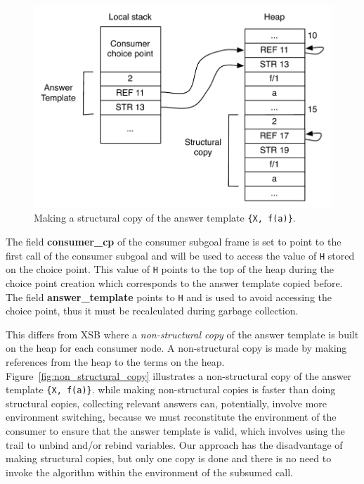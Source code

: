 \begin{figure}[H]
  \centering
    \includegraphics[scale=0.6]{structural_copy.pdf}
  \caption{Making a structural copy of the answer template \texttt{\{X,~f(a)\}}.}
  \label{fig:structural_copy}
\end{figure}

The field \textbf{consumer\_cp} of the consumer subgoal frame is set to point to the first call
of the consumer subgoal and will be used to access the value of \texttt{H} stored on the choice point.
This value of \texttt{H} points to the top of the heap during the choice point creation which corresponds
to the answer template copied before. The field \textbf{answer\_template} points to \texttt{H}
and is used to avoid accessing the choice point, thus it must be recalculated during garbage collection.

This differs from XSB \cite{Johnson-00} where a \textit{non-structural copy} of the answer template
is built on the heap for each consumer node. A non-structural copy is made by making references from
the heap to the terms on the heap. Figure~\ref{fig:non_structural_copy} illustrates a non-structural
copy of the answer template \texttt{\{X,~f(a)\}}. 
while making non-structural copies is faster than doing structural copies, collecting relevant answers
can, potentially, involve more environment switching, because we must reconstitute the environment of
the consumer to ensure that the answer template is valid, which involves using the trail to unbind
and/or rebind variables. Our approach has the disadvantage of making structural copies, but only one
copy is done and there is no need to invoke the algorithm within the environment of the subsumed call.

